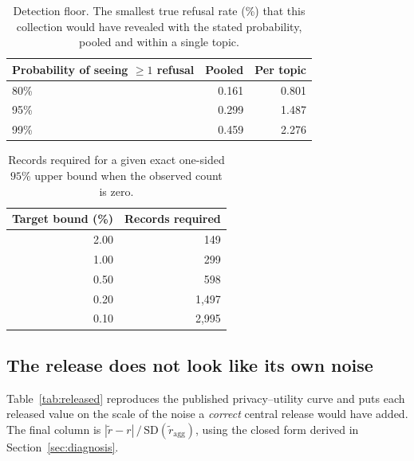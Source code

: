 \documentclass[journal]{IEEEtran}
\theoremstyle{definition}
\begin{document}
\begin{table}[t]
\centering
\caption{Detection floor. The smallest true refusal rate (\%) that this
collection would have revealed with the stated probability, pooled and within a
single topic.}
\label{tab:resolution}
\footnotesize
\setlength{\tabcolsep}{6pt}
\begin{tabular}{@{}lrr@{}}
\toprule
Probability of seeing $\ge 1$ refusal & Pooled & Per topic \\
\midrule
80\% & 0.161 & 0.801 \\
95\% & 0.299 & 1.487 \\
99\% & 0.459 & 2.276 \\
\bottomrule
\end{tabular}
\end{table}

\begin{table}[t]
\centering
\caption{Records required for a given exact one-sided $95$\% upper bound when
the observed count is zero.}
\label{tab:needed}
\footnotesize
\setlength{\tabcolsep}{6pt}
\begin{tabular}{@{}rr@{}}
\toprule
Target bound (\%) & Records required \\
\midrule
2.00 & 149 \\
1.00 & 299 \\
0.50 & 598 \\
0.20 & 1{,}497 \\
0.10 & 2{,}995 \\
\bottomrule
\end{tabular}
\end{table}

\subsection{The release does not look like its own noise}

Table~\ref{tab:released} reproduces the published privacy--utility curve and puts
each released value on the scale of the noise a \emph{correct} central release
would have added. The final column is $|\tilde{r} - r| \,/\, \mathrm{SD}
(\tilde{r}_{\mathrm{agg}})$, using the closed form derived in
Section~\ref{sec:diagnosis}.
\end{document}
